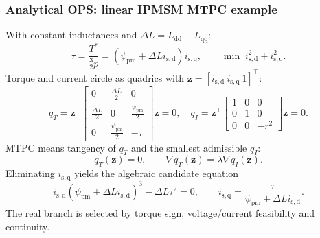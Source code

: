 \begin{frame}
    \frametitle{Analytical OPS: linear IPMSM MTPC example}
    With constant inductances and $\Delta L=L_{\mathrm{dd}}-L_{\mathrm{qq}}$:
    \[
        \tau=\frac{T^*}{\frac{3}{2}p}
        =\left(\psi_{\mathrm{pm}}+\Delta L i_{\mathrm{s,d}}\right)i_{\mathrm{s,q}},
        \qquad
        \min\; i_{\mathrm{s,d}}^2+i_{\mathrm{s,q}}^2 .
    \]\pause%
    Torque and current circle as quadrics with
    $\bm{z}=[i_{\mathrm{s,d}}\ i_{\mathrm{s,q}}\ 1]^\top$:
    \[
        q_T=\bm{z}^\top
        \begin{bmatrix}
            0                  & \frac{\Delta L}{2}           & 0                            \\
            \frac{\Delta L}{2} & 0                            & \frac{\psi_{\mathrm{pm}}}{2} \\
            0                  & \frac{\psi_{\mathrm{pm}}}{2} & -\tau
        \end{bmatrix}\bm{z}=0,
        \quad
        q_I=\bm{z}^\top
        \begin{bmatrix}
            1 & 0 & 0 \\0&1&0\\0&0&-r^2
        \end{bmatrix}\bm{z}=0 .
    \]\pause%
    MTPC means tangency of $q_T$ and the smallest admissible $q_I$:
    \[
        q_T(\bm{z})=0,
        \qquad
        \nabla q_T(\bm{z})=\lambda\nabla q_I(\bm{z}).
    \]\pause%
    Eliminating $i_{\mathrm{s,q}}$ yields the algebraic candidate equation
    \[
        i_{\mathrm{s,d}}\left(\psi_{\mathrm{pm}}+\Delta L i_{\mathrm{s,d}}\right)^3
        -\Delta L\tau^2=0,
        \qquad
        i_{\mathrm{s,q}}=\frac{\tau}{\psi_{\mathrm{pm}}+\Delta L i_{\mathrm{s,d}}} .
    \]\pause%
    The real branch is selected by torque sign, voltage/current feasibility and continuity.
\end{frame}

